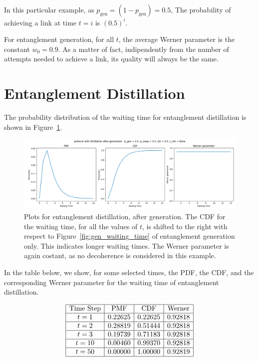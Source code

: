 \documentclass{masterthesis}
\begin{document}
In this particular example, as $p_\text{gen} = (1 - p_\text{gen}) = 0.5$, The probability of achieving a link at time $t = i$ is $(0.5)^i$.

For entanglement generation, for all $t$, the average Werner parameter is the constant $w_0 = 0.9$. As a matter of fact, indipendently from the number of attempts needed to achieve a link, its quality will always be the same.

\section{Entanglement Distillation}\label{section:entanglement_distillation_numerical_example}

The probability distribution of the waiting time for entanglement distillation is shown in Figure~\ref{fig:dist_waiting_time}.

\begin{figure}[ht]
    \centering
    \includegraphics[width=1\linewidth]{images/dist_tests/distillation after generation.png}
    \caption{Plots for entanglement distillation, after generation. The CDF for the waiting time, for all the values of $t$, is shifted to the right with respect to Figure~\ref{fig:gen_waiting_time} of entanglement generation only. This indicates longer waiting times. The Werner parameter is again costant, as no decoherence is considered in this example.}
    \label{fig:dist_waiting_time}
\end{figure}

In the table below, we show, for some selected times, the PDF, the CDF, and the corresponding Werner parameter for the waiting time of entanglement distillation.

\begin{equation*}
    \begin{array}{|c|c|c|c|}
        \hline
        \text{Time Step} & \text{PMF} & \text{CDF} & \text{Werner} \\
        \hline
        t = 1 & 0.22625 & 0.22625 & 0.92818 \\
        \hline
        t = 2 & 0.28819 & 0.51444 & 0.92818 \\
        \hline
        t = 3 & 0.19739 & 0.71183 & 0.92818 \\
        \hline
        t = 10 & 0.00460 & 0.99370 & 0.92818 \\
        \hline
        t = 50 & 0.00000 & 1.00000 & 0.92819 \\
        \hline
    \end{array}
\end{equation*}
\end{document}
